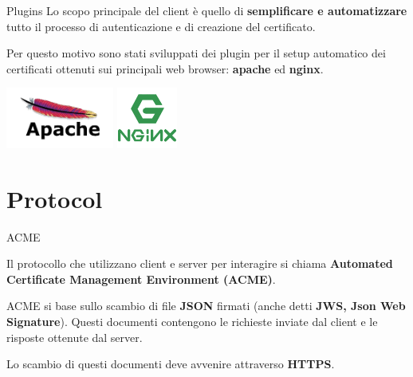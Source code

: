 \documentclass[xcolor=svgnames,11pt]{beamer}
\begin{document}
\begin{frame}{Plugins}
Lo scopo principale del client è quello di \textbf{semplificare e automatizzare} tutto il processo di
autenticazione e di creazione del certificato.

\medskip\pause

Per questo motivo sono stati sviluppati dei plugin per il setup automatico dei certificati ottenuti
sui principali web browser: \textbf{apache} ed \textbf{nginx}.

\begin{center}
\includegraphics[height=2cm]{img/apache_logo.png}
\includegraphics[height=2cm]{img/nginx_logo.png}
\end{center}

\end{frame}

\section{Protocol}
\begin{frame}{ACME}

\begin{block}{}
Il protocollo che utilizzano client e server per interagire si chiama \textbf{Automated Certificate Management Environment (ACME)}.
\end{block}

\medskip \pause
ACME si base sullo scambio di file \textbf{JSON} firmati (anche detti \textbf{JWS, Json Web Signature}).
Questi documenti contengono le richieste inviate dal client e le risposte ottenute dal server.

\medskip \pause
Lo scambio di questi documenti deve avvenire attraverso \textbf{HTTPS}.
\end{frame}
\end{document}
